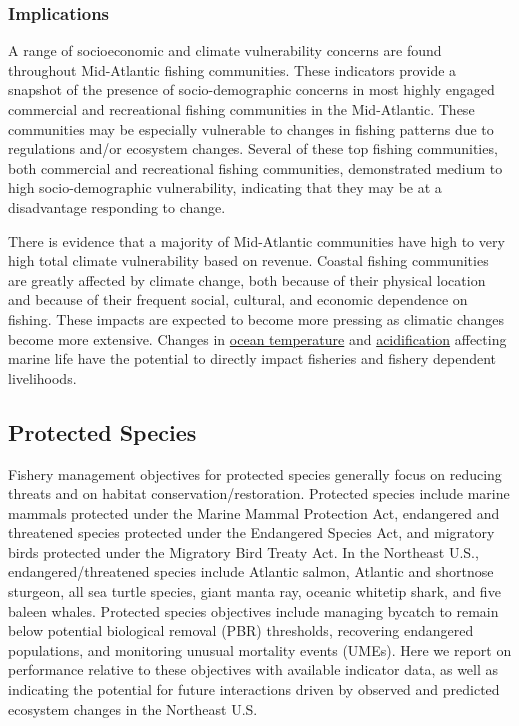 \documentclass[
  10pt,
]{article}
\begin{document}
\subsubsection{Implications}\label{implications-4}

A range of socioeconomic and climate vulnerability concerns are found throughout Mid-Atlantic fishing communities. These indicators provide a snapshot of the presence of socio-demographic concerns in most highly engaged commercial and recreational fishing communities in the Mid-Atlantic. These communities may be especially vulnerable to changes in fishing patterns due to regulations and/or ecosystem changes. Several of these top fishing communities, both commercial and recreational fishing communities, demonstrated medium to high socio-demographic vulnerability, indicating that they may be at a disadvantage responding to change.

There is evidence that a majority of Mid-Atlantic communities have high to very high total climate vulnerability based on revenue. Coastal fishing communities are greatly affected by climate change, both because of their physical location and because of their frequent social, cultural, and economic dependence on fishing. These impacts are expected to become more pressing as climatic changes become more extensive. Changes in \href{https://noaa-edab.github.io/catalog/bottom_temp_insitu.html}{ocean temperature} and \href{https://noaa-edab.github.io/catalog/ocean_acidification.html}{acidification} affecting marine life have the potential to directly impact fisheries and fishery dependent livelihoods.

\subsection{Protected Species}\label{protected-species}

Fishery management objectives for protected species generally focus on reducing threats and on habitat conservation/restoration. Protected species include marine mammals protected under the Marine Mammal Protection Act, endangered and threatened species protected under the Endangered Species Act, and migratory birds protected under the Migratory Bird Treaty Act. In the Northeast U.S., endangered/threatened species include Atlantic salmon, Atlantic and shortnose sturgeon, all sea turtle species, giant manta ray, oceanic whitetip shark, and five baleen whales. Protected species objectives include managing bycatch to remain below potential biological removal (PBR) thresholds, recovering endangered populations, and monitoring unusual mortality events (UMEs). Here we report on performance relative to these objectives with available indicator data, as well as indicating the potential for future interactions driven by observed and predicted ecosystem changes in the Northeast U.S.
\end{document}
